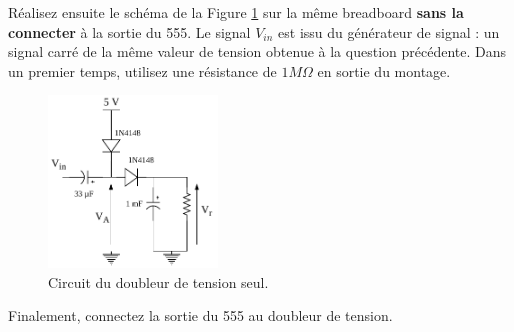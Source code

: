 \documentclass{../../template/labo}
\begin{document}
Réalisez ensuite le schéma de la Figure \ref{Doubleur2} sur la même breadboard \textbf{sans la connecter} à la sortie du 555. Le signal $V_{in}$ est issu du générateur de signal : un signal carré de la même valeur de tension obtenue à la question précédente.
Dans un premier temps, utilisez une résistance de $1 M\Omega$ en sortie du montage.




\begin{figure}[ht]
\centering
\includegraphics[width=0.4\textwidth]{doubler.pdf}
\caption{Circuit du doubleur de tension seul.}
\label{Doubleur2}
\end{figure}

{

}

{

}


Finalement, connectez la sortie du 555 au doubleur de tension.


{

}


{

}


{

}




\end{document}
